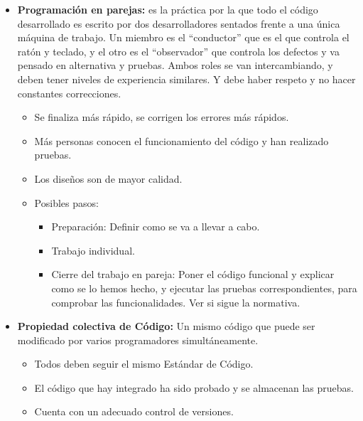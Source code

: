 \documentclass[12pt, twoside, openright]{report} %
\begin{document}
\begin{itemize}
\item \textbf{Programación en parejas:} es la práctica por la que todo el
  código desarrollado es escrito por dos desarrolladores sentados frente
  a una única máquina de trabajo. Un miembro es el \enquote{conductor} que es
  el que controla el ratón y teclado, y el otro es el \enquote{observador} que
  controla los defectos y va pensado en alternativa y pruebas. Ambos
  roles se van intercambiando, y deben tener niveles de experiencia
  similares. Y debe haber respeto y no hacer constantes correcciones.
  

  \begin{itemize}
  \item Se finaliza más rápido, se corrigen los errores más rápidos.
    
  \item Más personas conocen el funcionamiento del código y han realizado
    pruebas.
    
  \item Los diseños son de mayor calidad.
    
  \item Posibles pasos:
    

    \begin{itemize}
    \item Preparación: Definir como se va a llevar a cabo.
      
    \item Trabajo individual.
      
    \item Cierre del trabajo en pareja: Poner el código funcional y explicar
      como se lo hemos hecho, y ejecutar las pruebas correspondientes,
      para comprobar las funcionalidades. Ver si sigue la normativa.
      
    \end{itemize}
  \end{itemize}
\item \textbf{Propiedad colectiva de Código:} Un mismo código que puede ser
  modificado por varios programadores simultáneamente.
  

  \begin{itemize}
  \item Todos deben seguir el mismo Estándar de Código.
    
  \item El código que hay integrado ha sido probado y se almacenan las
    pruebas.
    
  \item Cuenta con un adecuado control de versiones.
    

\end{itemize}
\end{itemize}
\end{document}
